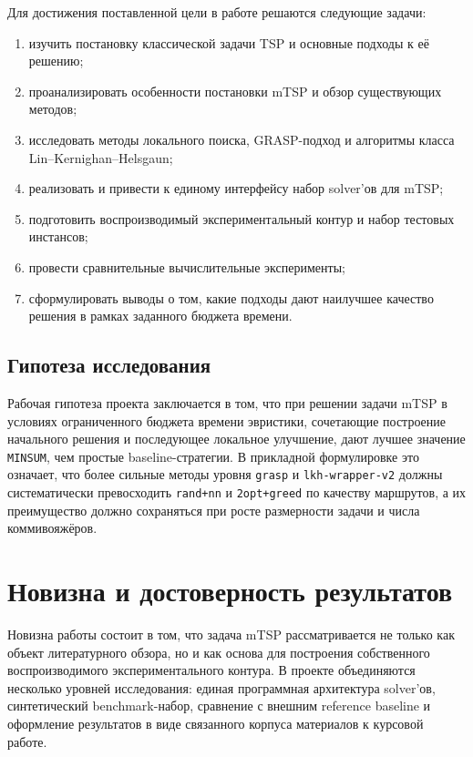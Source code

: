 \documentclass[a4paper,12pt]{article}
\begin{document}
Для достижения поставленной цели в работе решаются следующие задачи:
\begin{enumerate}[label=\arabic*.]
  \item изучить постановку классической задачи TSP и основные подходы к её решению;
  \item проанализировать особенности постановки mTSP и обзор существующих методов;
  \item исследовать методы локального поиска, GRASP-подход и алгоритмы класса Lin--Kernighan--Helsgaun;
  \item реализовать и привести к единому интерфейсу набор solver'ов для mTSP;
  \item подготовить воспроизводимый экспериментальный контур и набор тестовых инстансов;
  \item провести сравнительные вычислительные эксперименты;
  \item сформулировать выводы о том, какие подходы дают наилучшее качество решения в рамках заданного бюджета времени.
\end{enumerate}

\subsection{Гипотеза исследования}

Рабочая гипотеза проекта заключается в том, что при решении задачи mTSP в условиях ограниченного бюджета времени эвристики, сочетающие построение начального решения и последующее локальное улучшение, дают лучшее значение \texttt{MINSUM}, чем простые baseline-стратегии. В прикладной формулировке это означает, что более сильные методы уровня \texttt{grasp} и \texttt{lkh-wrapper-v2} должны систематически превосходить \texttt{rand+nn} и \texttt{2opt+greed} по качеству маршрутов, а их преимущество должно сохраняться при росте размерности задачи и числа коммивояжёров.

\section{Новизна и достоверность результатов}

Новизна работы состоит в том, что задача mTSP рассматривается не только как объект литературного обзора, но и как основа для построения собственного воспроизводимого экспериментального контура. В проекте объединяются несколько уровней исследования: единая программная архитектура solver'ов, синтетический benchmark-набор, сравнение с внешним reference baseline и оформление результатов в виде связанного корпуса материалов к курсовой работе.
\end{document}
